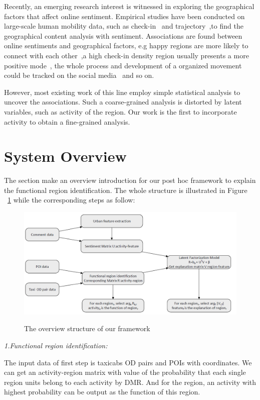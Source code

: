 \documentclass[runningheads]{llncs}
\begin{document}
Recently, an emerging research interest is witnessed in exploring the geographical factors that affect online sentiment.
Empirical studies have been conducted on large-scale human mobility data, such as check-in ~\cite{Gallegos16happier}and trajectory~\cite{Gonzlez2008Track},to find the geographical content analysis with sentiment.
Associations are found between online sentiments and geographical factors, e.g happy regions are more likely to connect with each other~\cite{Alshamsi15milan},a high check-in density region usually presents a more positive mode~\cite{Gallegos16happier}, the whole process and development of a organized movement could be tracked on the social media~\cite{Alvarez2015Movement} and so on.

However, most existing work of this line employ simple statistical analysis to uncover the associations.
Such a coarse-grained analysis is distorted by latent variables, such as activity of the region.
Our work is the first to incorporate activity to obtain a fine-grained analysis.

\section{System Overview}
The section make an overview introduction for our post hoc framework to explain the functional region identification.
The whole structure is illustrated in Figure ~\ref{overview} while the corresponding steps as follow:

\begin{figure}[h]
  \centering
  \includegraphics[scale=0.3]{overview.png}
  \label{overview}
  \caption{The overview structure of our framework}
\end{figure}

\emph{1.Functional region identification:}

The input data of first step is taxicabs OD pairs and POIs with coordinates.
We can get an activity-region matrix with value of the probability that each single region units belong to each activity by DMR.
And for the region, an activity with highest probability can be output as the function of this region.
\end{document}
